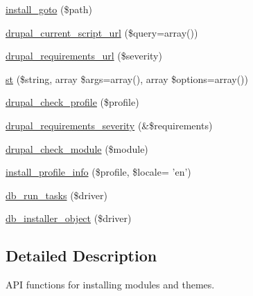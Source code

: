 \begin{DoxyCompactItemize}
\item 
\hyperlink{install_8inc_a8500b736c9651e3947265d35fc6ab920}{install\_\-goto} (\$path)
\item 
\hyperlink{install_8inc_a75c4f99a27a5a65328abc0eaa1f928e3}{drupal\_\-current\_\-script\_\-url} (\$query=array())
\item 
\hyperlink{install_8inc_aa26d690c87ca7a7a2aedd9cd4679274a}{drupal\_\-requirements\_\-url} (\$severity)
\item 
\hyperlink{group__sanitization_gabc78d1b88aa8081093abbbf71a516c7c}{st} (\$string, array \$args=array(), array \$options=array())
\item 
\hyperlink{install_8inc_a836bd8c91fc428e6d7c5bc6306dc6f5c}{drupal\_\-check\_\-profile} (\$profile)
\item 
\hyperlink{install_8inc_aa9ea0f7df004333efbdd03025f5a9c94}{drupal\_\-requirements\_\-severity} (\&\$requirements)
\item 
\hyperlink{install_8inc_a3b9fc21890b0b9307383a1f6a813b859}{drupal\_\-check\_\-module} (\$module)
\item 
\hyperlink{install_8inc_ad035099993d5a0dc4bad7ce81264c88d}{install\_\-profile\_\-info} (\$profile, \$locale= 'en')
\item 
\hyperlink{install_8inc_a57bfe6a3b39d6f931fe965a93e7eec83}{db\_\-run\_\-tasks} (\$driver)
\item 
\hyperlink{install_8inc_aae9b6ee5100acd83eabbb2b2c2ab02c6}{db\_\-installer\_\-object} (\$driver)
\end{DoxyCompactItemize}


\subsection{Detailed Description}
API functions for installing modules and themes. 

